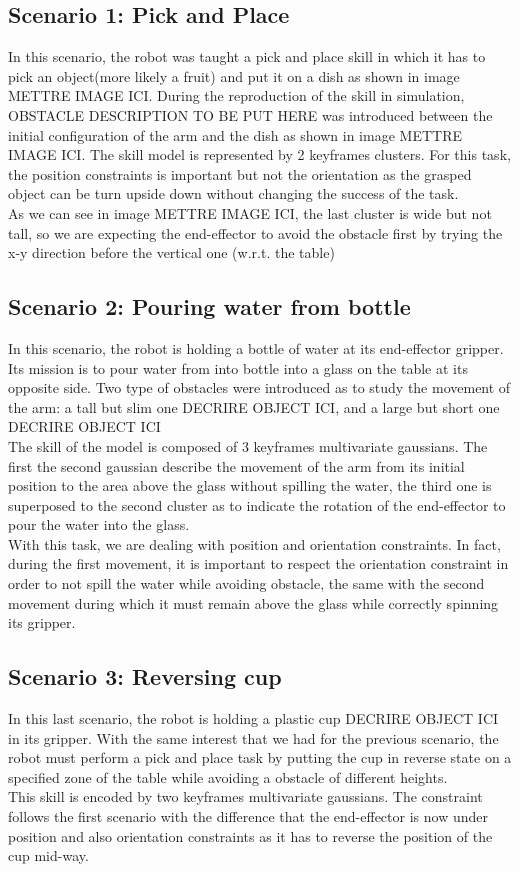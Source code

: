 \documentclass[letterpaper, 10 pt, conference]{ieeeconf}  %
\begin{document}
\subsection{Scenario 1: Pick and Place}
In this scenario, the robot was taught a pick and place skill in which it has to pick an object(more likely a fruit) and put it on a dish as shown in image METTRE IMAGE ICI. During the reproduction of the skill in simulation, OBSTACLE DESCRIPTION TO BE PUT HERE  was introduced between the initial configuration of the arm and the dish as shown in image METTRE IMAGE ICI.
 The skill model is represented by 2 keyframes clusters. For this task, the position constraints is important but not the orientation as the grasped object can be turn upside down without changing the success of the task.\\
 As we can see in image METTRE IMAGE ICI, the last cluster is wide but not tall, so we are expecting the end-effector to avoid the obstacle first by trying the x-y direction before the vertical one (w.r.t. the table)

\subsection{Scenario 2: Pouring water from bottle}
In this scenario, the robot is holding a bottle of water at its end-effector gripper. Its mission is to pour water from into bottle into a glass on the table at its opposite side.
Two type of obstacles were introduced as to study the movement of the arm: a tall but slim one DECRIRE OBJECT ICI, and a large but short one DECRIRE OBJECT ICI\\
The skill of the model is composed of 3 keyframes multivariate gaussians. The first the second gaussian describe the movement of the arm from its initial position to the area above the glass without spilling the water, the third one is superposed to the second cluster as to indicate the rotation of the end-effector to pour the water into the glass.\\
With this task, we are dealing with position and orientation constraints. In fact, during the first movement, it is important to respect the orientation constraint in order to not spill the water while avoiding obstacle, the same with the second movement during which it must remain above the glass while correctly spinning its gripper.\\

\subsection{Scenario 3: Reversing cup}
In this last scenario, the robot is holding a plastic cup DECRIRE OBJECT ICI in its gripper. With the same interest that we had for the previous scenario, the robot must perform a pick and place task by putting the cup in reverse state on a specified zone of the table while avoiding a obstacle of different heights. \\
This skill is encoded by two keyframes multivariate gaussians. The constraint follows the first scenario with the difference that the end-effector is now under position and also orientation constraints as it has to reverse the position of the cup mid-way.
\end{document}
